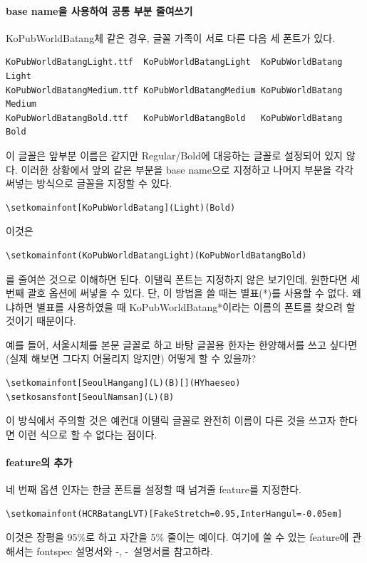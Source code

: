 \documentclass[
	12pt,
	a4paper,
	kosection,
	footnote,
	microtype,
	figtabcapt,
]{oblivoir}
\def\xetexko{\XeTeX-\ko}
\def\luatexko{\LuaTeX-\ko}
\begin{document}
\paragraph{base name을 사용하여 공통 부분 줄여쓰기}
KoPubWorldBatang체 같은 경우, 글꼴 가족이 서로 다른 다음 세 폰트가 있다.
\begin{verbatim}
KoPubWorldBatangLight.ttf  KoPubWorldBatangLight  KoPubWorldBatang Light
KoPubWorldBatangMedium.ttf KoPubWorldBatangMedium KoPubWorldBatang Medium
KoPubWorldBatangBold.ttf   KoPubWorldBatangBold   KoPubWorldBatang Bold
\end{verbatim}
이 글꼴은 앞부분 이름은 같지만 Regular/Bold에 대응하는 글꼴로 설정되어 있지 않다.
이러한 상황에서 앞의 같은 부분을 base name으로 지정하고 나머지 부분을 각각 써넣는 방식으로 
글꼴을 지정할 수 있다.
\begin{verbatim}
\setkomainfont[KoPubWorldBatang](Light)(Bold)
\end{verbatim}
이것은
\begin{verbatim}
\setkomainfont(KoPubWorldBatangLight)(KoPubWorldBatangBold)
\end{verbatim}
를 줄여쓴 것으로 이해하면 된다. 이탤릭 폰트는 지정하지 않은 보기인데, 원한다면 세번째 괄호 옵션에
써넣을 수 있다. 단, 이 방법을 쓸 때는 별표(*)를 사용할 수 없다. 왜냐하면 별표를 사용하였을 때
KoPubWorldBatang*이라는 이름의 폰트를 찾으려 할 것이기 때문이다.

예를 들어, 서울시체를 본문 글꼴로 하고 바탕 글꼴용 한자는 한양해서를 쓰고 싶다면(실제 해보면 그다지 어울리지 않지만) 어떻게 할 수 있을까?
\begin{verbatim}
\setkomainfont[SeoulHangang](L)(B)[](HYhaeseo)
\setkosansfont[SeoulNamsan](L)(B)
\end{verbatim}

이 방식에서 주의할 것은 예컨대 이탤릭 글꼴로 완전히 이름이 다른 것을 쓰고자 한다면
이런 식으로 할 수 없다는 점이다.

\paragraph{feature의 추가}
네 번째 옵션 인자는 한글 폰트를 설정할 때 넘겨줄 feature를 지정한다.
\begin{verbatim}
\setkomainfont(HCRBatangLVT)[FakeStretch=0.95,InterHangul=-0.05em]
\end{verbatim}
이것은 장평을 95\%로 하고 자간을 5\% 줄이는 예이다. 여기에 쓸 수 있는 feature에 관해서는
fontspec 설명서와 \xetexko, \luatexko\ 설명서를 참고하라.
\end{document}
